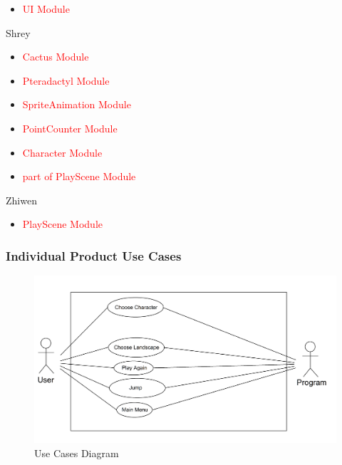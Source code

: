 \documentclass[12pt, titlepage]{article}
\begin{document}
\begin{itemize}
\item{\textcolor{red}{UI Module}}
\end{itemize}
Shrey
\begin{itemize}
\item{\textcolor{red}{Cactus Module}}
\item{\textcolor{red}{Pteradactyl Module}}
\item{\textcolor{red}{SpriteAnimation Module}}
\item{\textcolor{red}{PointCounter Module}}
\item{\textcolor{red}{Character Module}}
\item{\textcolor{red}{part of PlayScene Module}}
\end{itemize}
Zhiwen
\begin{itemize}
\item{\textcolor{red}{PlayScene Module}}
\end{itemize}


\subsubsection{Individual Product Use Cases}
\begin{figure}
\includegraphics[width = \linewidth]{Use_Case_v1}
\caption{Use Cases Diagram}
\label{Figure 1: Use Cases}
\end{figure}
\end{document}
